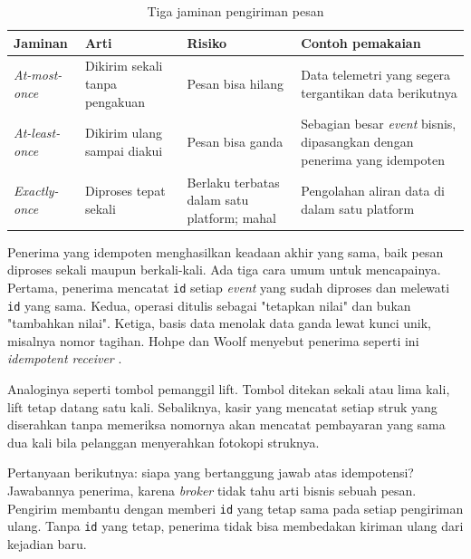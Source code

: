 \begin{table}[!htb]
  \centering
  \caption{Tiga jaminan pengiriman pesan}
  \label{tab:ch09-jaminan}
  \footnotesize
  \begin{tabularx}{\textwidth}{>{\raggedright\arraybackslash}p{2.2cm} >{\raggedright\arraybackslash}X >{\raggedright\arraybackslash}X >{\raggedright\arraybackslash}X}
    \hline
    \textbf{Jaminan} & \textbf{Arti} & \textbf{Risiko} & \textbf{Contoh pemakaian} \\ \hline
    \textit{At-most-once} & Dikirim sekali tanpa pengakuan & Pesan bisa hilang & Data telemetri yang
      segera tergantikan data berikutnya \\ \hline
    \textit{At-least-once} & Dikirim ulang sampai diakui & Pesan bisa ganda & Sebagian besar
      \textit{event} bisnis, dipasangkan dengan penerima yang idempoten \\ \hline
    \textit{Exactly-once} & Diproses tepat sekali & Berlaku terbatas dalam satu platform; mahal &
      Pengolahan aliran data di dalam satu platform \\ \hline
  \end{tabularx}
\end{table}

Penerima yang idempoten menghasilkan keadaan akhir yang sama, baik pesan diproses sekali maupun
berkali-kali. Ada tiga cara umum untuk mencapainya. Pertama, penerima mencatat \texttt{id} setiap
\textit{event} yang sudah diproses dan melewati \texttt{id} yang sama. Kedua, operasi ditulis
sebagai "tetapkan nilai" dan bukan "tambahkan nilai". Ketiga, basis data menolak data ganda lewat
kunci unik, misalnya nomor tagihan. Hohpe dan Woolf menyebut penerima seperti ini
\textit{idempotent receiver} \cite{c09-hohpe2003}.

Analoginya seperti tombol pemanggil lift. Tombol ditekan sekali atau lima kali, lift tetap datang
satu kali. Sebaliknya, kasir yang mencatat setiap struk yang diserahkan tanpa memeriksa nomornya akan
mencatat pembayaran yang sama dua kali bila pelanggan menyerahkan fotokopi struknya.

Pertanyaan berikutnya: siapa yang bertanggung jawab atas idempotensi? Jawabannya penerima, karena
\textit{broker} tidak tahu arti bisnis sebuah pesan. Pengirim membantu dengan memberi \texttt{id}
yang tetap sama pada setiap pengiriman ulang. Tanpa \texttt{id} yang tetap, penerima tidak bisa
membedakan kiriman ulang dari kejadian baru.

